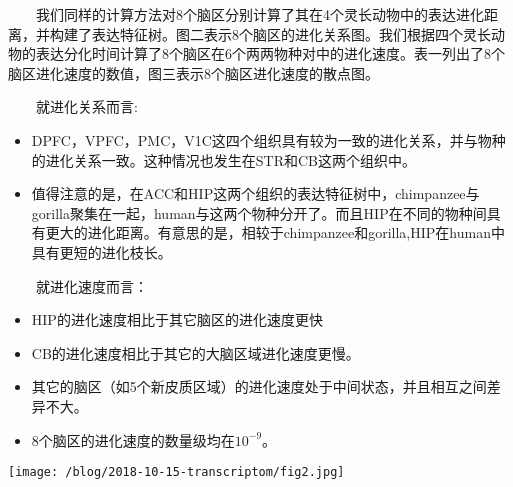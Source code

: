 \documentclass[hyperref,]{ctexart}
\providecommand{\tightlist}{%
  \setlength{\itemsep}{0pt}\setlength{\parskip}{0pt}}
\begin{document}
  我们同样的计算方法对8个脑区分别计算了其在4个灵长动物中的表达进化距离，并构建了表达特征树。图二表示8个脑区的进化关系图。我们根据四个灵长动物的表达分化时间计算了8个脑区在6个两两物种对中的进化速度。表一列出了8个脑区进化速度的数值，图三表示8个脑区进化速度的散点图。

  就进化关系而言:

\begin{itemize}
\tightlist
\item
  DPFC，VPFC，PMC，V1C这四个组织具有较为一致的进化关系，并与物种的进化关系一致。这种情况也发生在STR和CB这两个组织中。
\item
  值得注意的是，在ACC和HIP这两个组织的表达特征树中，chimpanzee与gorilla聚集在一起，human与这两个物种分开了。而且HIP在不同的物种间具有更大的进化距离。有意思的是，相较于chimpanzee和gorilla,HIP在human中具有更短的进化枝长。
\end{itemize}

  就进化速度而言：

\begin{itemize}
\tightlist
\item
  HIP的进化速度相比于其它脑区的进化速度更快
\item
  CB的进化速度相比于其它的大脑区域进化速度更慢。
\item
  其它的脑区（如5个新皮质区域）的进化速度处于中间状态，并且相互之间差异不大。
\item
  8个脑区的进化速度的数量级均在\(10^{-9}\)。
\end{itemize}

\texttt{[image: /blog/2018-10-15-transcriptom/fig2.jpg]}
\end{document}
